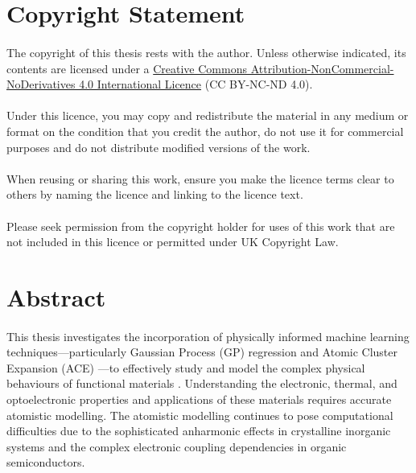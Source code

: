 \newpage
\thispagestyle{plain}
\section*{\Huge Copyright Statement}
\paragraph{}
\label{CS}
The copyright of this thesis rests with the author. Unless otherwise indicated, its contents
are licensed under a \href{https://creativecommons.org/licenses/by-nc-nd/4.0/}{Creative Commons Attribution-NonCommercial-NoDerivatives 4.0 International Licence} (CC BY-NC-ND 4.0).
\paragraph{}
Under this licence, you may copy and redistribute the material in any medium or format
on the condition that you credit the author, do not use it for commercial purposes and do
not distribute modified versions of the work.
\paragraph{}
When reusing or sharing this work, ensure you make the licence terms clear to others by
naming the licence and linking to the licence text.
\paragraph{}
Please seek permission from the copyright holder for uses of this work that are not included
in this licence or permitted under UK Copyright Law.
\newpage
\thispagestyle{plain}
\section*{\Huge Abstract}
\paragraph{}
\label{abs}
This thesis investigates the incorporation of physically informed machine learning techniques—particularly Gaussian Process (GP) regression \cite{RasmussenW06} and Atomic Cluster Expansion (ACE) \cite{Drautz2019}—to effectively study and model the complex physical behaviours of functional materials \cite{Deringer2021, Musil2021}. Understanding the electronic, thermal, and optoelectronic properties and applications of these materials requires accurate atomistic modelling. The atomistic modelling continues to pose computational difficulties due to the sophisticated anharmonic effects in crystalline inorganic systems and the complex electronic coupling dependencies in organic semiconductors.

